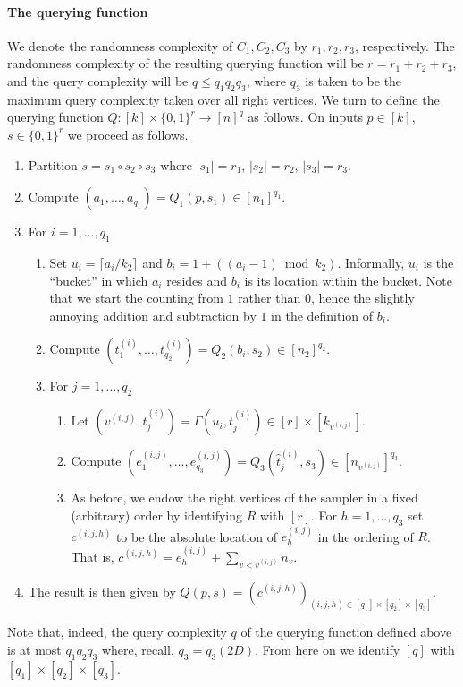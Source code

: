 \documentclass[10pt,a4paper]{article}
\begin{document}
\paragraph{The querying function}
We denote the randomness complexity of $C_1,C_2,C_3$ by $r_1,r_2,r_3$, respectively. The randomness complexity of the resulting querying function will be $r=r_1+r_2+r_3$, and the query complexity will be $q\leq q_1q_2q_3$, where $q_3$ is taken to be the maximum query complexity taken over all right vertices. We turn to define the querying function $Q:[k]\times\{0,1\}^r\to[n]^q$ as follows. On inputs $p\in[k]$, $s\in\{0,1\}^r$ we proceed as follows.
\begin{enumerate}
\item Partition $s=s_1\circ s_2\circ s_3$ where $|s_1|=r_1$, $|s_2|=r_2$, $|s_3|=r_3$.
\item Compute $(a_1,\ldots,a_{q_1})=Q_1(p,s_1)\in[n_1]^{q_1}$.
\item For $i=1,\ldots,q_1$
\begin{enumerate}
\item Set $u_i=\lceil a_i/k_2\rceil$ and $b_i=1+((a_i-1)\bmod k_2)$. Informally, $u_i$ is the ``bucket'' in which $a_i$ resides and $b_i$ is its location within the bucket. Note that we start the counting from $1$ rather than $0$, hence the slightly annoying addition and subtraction by $1$ in the definition of $b_i$.
\item Compute $(t_1^{(i)},\ldots,t_{q_2}^{(i)})=Q_2(b_i,s_2)\in[n_2]^{q_2}$.
\item For $j=1,\ldots,q_2$
\begin{enumerate}
\item Let $(v^{(i,j)},\widehat t_j^{(i)})=\Gamma(u_i,t_j^{(i)})\in[r]\times[k_{v^{(i,j)}}]$.
\item Compute $(e_1^{(i,j)},\ldots,e_{q_3}^{(i,j)})=Q_3(\widehat t_j^{(i)},s_3)\in[n_{v^{(i,j)}}]^{q_3}$.
\item As before, we endow the right vertices of the sampler in a fixed (arbitrary) order by identifying $R$ with $[r]$. For $h=1,\ldots,q_3$ set $c^{(i,j,h)}$ to be the absolute location of $e_h^{(i,j)}$ in the ordering of $R$. That is, $c^{(i,j,h)}=e_h^{(i,j)}+\sum_{v<v^{(i,j)}}n_v$.
\end{enumerate}
\end{enumerate}
\item The result is then given by $Q(p,s)=(c^{(i,j,h)})_{(i,j,h)\in[q_1]\times[q_2]\times[q_3]}$.
\end{enumerate}
Note that, indeed, the query complexity $q$ of the querying function defined above is at most $q_1q_2q_3$ where, recall, $q_3=q_3(2D)$. From here on we identify $[q]$ with $[q_1]\times[q_2]\times[q_3]$.
\end{document}
